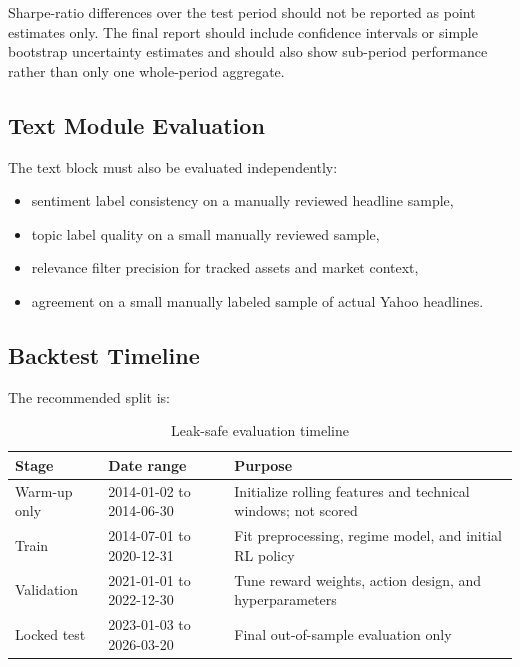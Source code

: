 \documentclass[11pt,a4paper]{article}
\begin{document}
Sharpe-ratio differences over the test period should not be reported as point estimates only.
The final report should include confidence intervals or simple bootstrap uncertainty estimates and should also show sub-period performance rather than only one whole-period aggregate.

\subsection{Text Module Evaluation}

The text block must also be evaluated independently:

\begin{itemize}[leftmargin=1.4em]
  \item sentiment label consistency on a manually reviewed headline sample,
  \item topic label quality on a small manually reviewed sample,
  \item relevance filter precision for tracked assets and market context,
  \item agreement on a small manually labeled sample of actual Yahoo headlines.
\end{itemize}

\subsection{Backtest Timeline}

The recommended split is:

\begin{table}[H]
\centering
\caption{Leak-safe evaluation timeline}
\begin{tabularx}{\textwidth}{@{}P{0.18\textwidth}P{0.25\textwidth}Y@{}}
\toprule
{}
\textbf{Stage} & \textbf{Date range} & \textbf{Purpose} \\
\midrule
Warm-up only & 2014-01-02 to 2014-06-30 & Initialize rolling features and technical windows; not scored \\
Train & 2014-07-01 to 2020-12-31 & Fit preprocessing, regime model, and initial RL policy \\
Validation & 2021-01-01 to 2022-12-30 & Tune reward weights, action design, and hyperparameters \\
Locked test & 2023-01-03 to 2026-03-20 & Final out-of-sample evaluation only \\
\bottomrule
\end{tabularx}
\end{table}
\end{document}
